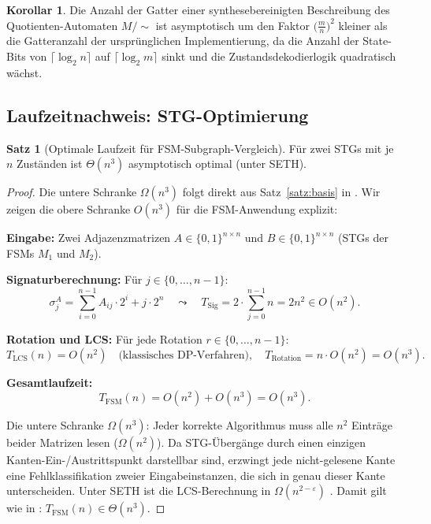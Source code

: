 ﻿\documentclass[a4paper,12pt]{article}
\theoremstyle{definition}
\newtheorem{satz}{Satz}
\newtheorem{korollar}{Korollar}
\begin{document}
\begin{korollar}
  Die Anzahl der Gatter einer synthesebereinigten Beschreibung des Quotienten-Automaten
  $M/\!\sim$ ist asymptotisch um den Faktor $\bigl(\frac{m}{n}\bigr)^2$ kleiner als die
  Gatteranzahl der ursprünglichen Implementierung, da die Anzahl der State-Bits von
  $\lceil \log_2 n \rceil$ auf $\lceil \log_2 m \rceil$ sinkt und die Zustandsdekodierlogik
  quadratisch wächst.
\end{korollar}

\subsection{Laufzeitnachweis: STG-Optimierung}\label{sec:stg_laufzeit}

\begin{satz}[Optimale Laufzeit für FSM-Subgraph-Vergleich]\label{satz:stg_opt}
  Für zwei STGs mit je $n$ Zuständen ist $\Theta(n^3)$ asymptotisch optimal (unter SETH).
\end{satz}

\begin{proof}
  Die untere Schranke $\Omega(n^3)$ folgt direkt aus Satz~\ref{satz:basis} in
  \cite{subgraph2026}. Wir zeigen die obere Schranke $O(n^3)$ für die FSM-Anwendung
  explizit:

  \textbf{Eingabe:} Zwei Adjazenzmatrizen $A \in \{0,1\}^{n \times n}$ und
  $B \in \{0,1\}^{n \times n}$ (STGs der FSMs $M_1$ und $M_2$).

  \textbf{Signaturberechnung:} Für $j \in \{0, \ldots, n-1\}$:
  \[
    \sigma_j^A = \sum_{i=0}^{n-1} A_{ij} \cdot 2^i + j \cdot 2^n
    \quad \leadsto \quad T_{\text{Sig}} = 2 \cdot \sum_{j=0}^{n-1} n = 2n^2 \in O(n^2).
  \]

  \textbf{Rotation und LCS:} Für jede Rotation $r \in \{0, \ldots, n-1\}$:
  \[
    T_{\text{LCS}}(n) = O(n^2) \quad \text{(klassisches DP-Verfahren)},
    \quad T_{\text{Rotation}} = n \cdot O(n^2) = O(n^3).
  \]

  \textbf{Gesamtlaufzeit:}
  \[
    T_{\text{FSM}}(n) = O(n^2) + O(n^3) = O(n^3).
  \]

  Die untere Schranke $\Omega(n^3)$: Jeder korrekte Algorithmus muss alle $n^2$
  Einträge beider Matrizen lesen ($\Omega(n^2)$). Da STG-Übergänge durch einen
  einzigen Kanten-Ein-/Austrittspunkt darstellbar sind, erzwingt jede nicht-gelesene
  Kante eine Fehlklassifikation zweier Eingabeinstanzen, die sich in genau dieser Kante
  unterscheiden. Unter SETH ist die LCS-Berechnung in $\Omega(n^{2-\varepsilon})$
  \cite{abboud2015tight}. Damit gilt wie in \cite{subgraph2026}: $T_{\text{FSM}}(n)
  \in \Theta(n^3)$.
\end{proof}
\end{document}
